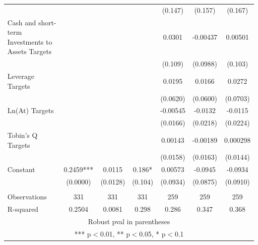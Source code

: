\documentclass[12pt]{article}
\begin{document}
\begin{table}[ht]
\begin{adjustbox}{height=10cm, max width=\textwidth}
\begin{tabular}{lcccccc}
			&  &  &  & (0.147) & (0.157) & (0.167) \\
		   Cash and short-term Investments to Assets Targets &  &  &  & 0.0301 & -0.00437 & 0.00501 \\
			&  &  &  & (0.109) & (0.0988) & (0.103) \\
		   Leverage Targets &  &  &  & 0.0195 & 0.0166 & 0.0272 \\
			&  &  &  & (0.0620) & (0.0600) & (0.0703) \\
		   Ln(At) Targets &  &  &  & -0.00545 & -0.0132 & -0.0115 \\
			&  &  &  & (0.0166) & (0.0218) & (0.0224) \\
		   Tobin's Q Targets &  &  &  & 0.00143 & -0.00189 & 0.000298 \\
			&  &  &  & (0.0158) & (0.0163) & (0.0144) \\
		   Constant & 0.2459*** & 0.0115 & 0.186* & 0.00573 & -0.0945 & -0.0934 \\
			& (0.0000) & (0.0128) & (0.104) & (0.0934) & (0.0875) & (0.0910) \\
			&  &  &  &  &  &  \\
		   Observations & 331 & 331 & 331 & 259 & 259 & 259 \\
			R-squared & 0.2504 & 0.0081 & 0.298 & 0.286 & 0.347 & 0.368 \\ \hline
		   \multicolumn{7}{c}{ Robust pval in parentheses} \\
		   \multicolumn{7}{c}{ *** p$<$0.01, ** p$<$0.05, * p$<$0.1} \\
		   \end{tabular}		   
	\end{adjustbox}
	\end{table}
\end{document}
